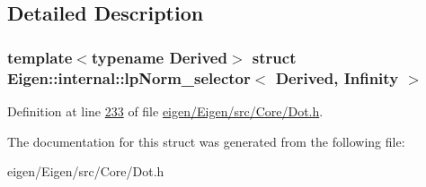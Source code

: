 \subsection{Detailed Description}
\subsubsection*{template$<$typename Derived$>$\newline
struct Eigen\+::internal\+::lp\+Norm\+\_\+selector$<$ Derived, Infinity $>$}



Definition at line \hyperlink{eigen_2_eigen_2src_2_core_2_dot_8h_source_l00233}{233} of file \hyperlink{eigen_2_eigen_2src_2_core_2_dot_8h_source}{eigen/\+Eigen/src/\+Core/\+Dot.\+h}.



The documentation for this struct was generated from the following file\+:\begin{DoxyCompactItemize}
\item 
eigen/\+Eigen/src/\+Core/\+Dot.\+h\end{DoxyCompactItemize}
